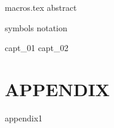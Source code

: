 \documentclass[11pt,oneside,english]{book}
\begin{document}



\runfrontend{}

{macros.tex}
{abstract}

\sumario

\listadefiguras

\listadetabelas

\listadeacronimos

\markboth{}{}



{symbols}
{notation}

\mainmatter 
\setcounter{page}{1} \pagestyle{plain} 

{capt_01}
{capt_02}


%


\part*{APPENDIX}
\appendix
{appendix1}
\end{document}
